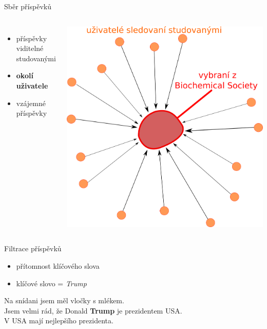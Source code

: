 \documentclass[notheorems,12pt]{beamer}
\newcommand{\cmark}{\ding{51}} %
\newcommand{\xmark}{\ding{55}} %
\begin{document}
\begin{frame}{Sběr příspěvků}
    \begin{columns}
    \column{5cm}
    	\begin{itemize}
            \item příspěvky viditelné studovanými
    		\item \textbf{okolí uživatele}
    		\item vzájemné příspěvky
    	\end{itemize}
    \column{6cm}
    	\center
    	\includegraphics[scale=0.4]{./Pics/followers.png}
    \end{columns}
\end{frame}
\begin{frame}{Filtrace příspěvků}
    \begin{itemize}
        \item přítomnost klíčového slova
        \item klíčové slovo = \textit{Trump}
    \end{itemize}
    \center
    Na snídani jsem měl vločky s mlékem. \xmark\\
    \vspace{0.2cm}
    Jsem velmi rád, že Donald \textbf{Trump} je prezidentem USA. \cmark\\
    \vspace{0.2cm}
    V USA mají nejlepšího prezidenta. \xmark\\
\end{frame}
\end{document}

